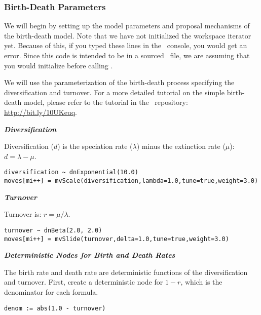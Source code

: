 \subsubsection{Birth-Death Parameters}

We will begin by setting up the model parameters and proposal mechanisms of the birth-death model. 
Note that we have not initialized the workspace iterator  yet. 
Because of this, if you typed these lines in the \RevBayes~console, you would get an error. 
Since this code is intended to be in a sourced \Rev~file, we are assuming that you would initialize  before calling .

We will use the parameterization of the birth-death process specifying the diversification and turnover.
For a more detailed tutorial on the simple birth-death model, please refer to the tutorial in the \RevBayes~repository: \href{http://bit.ly/10UKeuq}{http://bit.ly/10UKeuq}.

\textbf{\textit{Diversification}}

Diversification ($d$) is the speciation rate ($\lambda$) minus the extinction rate ($\mu$): $d = \lambda - \mu$.
{\tt \begin{snugshade*}
\begin{lstlisting}
diversification ~ dnExponential(10.0) 
moves[mi++] = mvScale(diversification,lambda=1.0,tune=true,weight=3.0)
\end{lstlisting}
\end{snugshade*}}

\textbf{\textit{Turnover}}

Turnover is: $r = \mu / \lambda$.
{\tt \begin{snugshade*}
\begin{lstlisting}
turnover ~ dnBeta(2.0, 2.0) 
moves[mi++] = mvSlide(turnover,delta=1.0,tune=true,weight=3.0)
\end{lstlisting}
\end{snugshade*}}

\textbf{\textit{Deterministic Nodes for Birth and Death Rates}}

The birth rate and death rate are deterministic functions of the diversification and turnover.
First, create a deterministic node for $1 - r$, which is the denominator for each formula.

{\tt \begin{snugshade*}
\begin{lstlisting}
denom := abs(1.0 - turnover) 
\end{lstlisting}
\end{snugshade*}}

